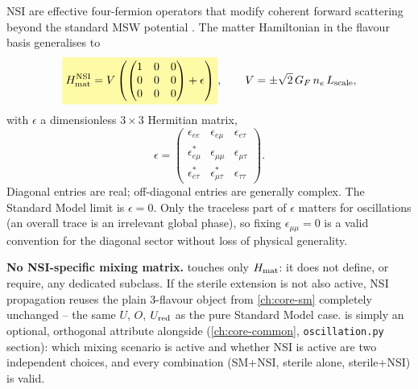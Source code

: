 \begin{theorybox}
NSI are effective four-fermion operators that modify coherent forward
scattering beyond the standard MSW potential \parencite{Grossman1995}. The
matter Hamiltonian in the flavour basis generalises to
\begin{equation}
  \keyresult{H_{\rm mat}^{\rm NSI} = V\left(\begin{pmatrix}1&0&0\\0&0&0\\0&0&0\end{pmatrix} + \epsilon\right)},
  \qquad V = \pm\sqrt2\,G_F\,n_e\,L_{\rm scale},
\end{equation}
with $\epsilon$ a dimensionless $3\times3$ Hermitian matrix,
\begin{equation}
  \epsilon = \begin{pmatrix}
    \epsilon_{ee} & \epsilon_{e\mu} & \epsilon_{e\tau} \\
    \epsilon_{e\mu}^* & \epsilon_{\mu\mu} & \epsilon_{\mu\tau} \\
    \epsilon_{e\tau}^* & \epsilon_{\mu\tau}^* & \epsilon_{\tau\tau}
  \end{pmatrix}.
\end{equation}
Diagonal entries are real; off-diagonal entries are generally complex. The
Standard Model limit is $\epsilon=0$. Only the traceless part of $\epsilon$
matters for oscillations (an overall trace is an irrelevant global phase),
so fixing $\epsilon_{\mu\mu}=0$ is a valid convention for the diagonal
sector without loss of physical generality.

\textbf{No NSI-specific mixing matrix.}  touches only
$H_{\rm mat}$: it does not define, or require, any dedicated 
subclass. If the sterile extension is not also active, NSI propagation
reuses the plain 3-flavour  object from \cref{ch:core-sm}
completely unchanged -- the same $U$, $O$, $U_{\rm red}$ as the pure
Standard Model case.  is simply an
optional, orthogonal attribute alongside 
(\cref{ch:core-common}, \texttt{oscillation.py} section): which mixing
scenario is active and whether NSI is active are two independent choices,
and every combination (SM+NSI, sterile alone, sterile+NSI) is valid.
\end{theorybox}

